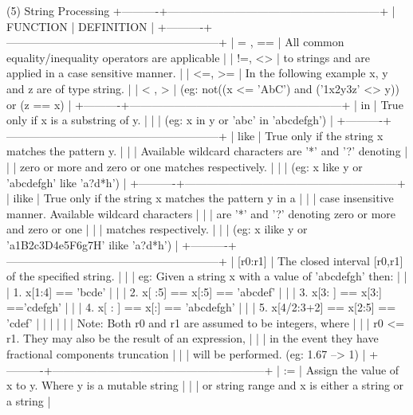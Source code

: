 (5) String Processing
+----------+---------------------------------------------------------+
| FUNCTION | DEFINITION                                              |
+----------+---------------------------------------------------------+
|  = , ==  | All common equality/inequality operators are applicable |
|  !=, <>  | to strings and are applied in a case sensitive manner.  |
|  <=, >=  | In the following example x, y and z are of type string. |
|  < , >   | (eg: not((x <= 'AbC') and ('1x2y3z' <> y)) or (z == x)  |
+----------+---------------------------------------------------------+
| in       | True only if x is a substring of y.                     |
|          | (eg: x in y or 'abc' in 'abcdefgh')                     |
+----------+---------------------------------------------------------+
| like     | True only if the string x matches the pattern y.        |
|          | Available wildcard characters are '*' and '?' denoting  |
|          | zero or more and zero or one matches respectively.      |
|          | (eg: x like y or 'abcdefgh' like 'a?d*h')               |
+----------+---------------------------------------------------------+
| ilike    | True only if the string x matches the pattern y in a    |
|          | case insensitive manner. Available wildcard characters  |
|          | are '*' and '?' denoting zero or more and zero or one   |
|          | matches respectively.                                   |
|          | (eg: x ilike y or 'a1B2c3D4e5F6g7H' ilike 'a?d*h')      |
+----------+---------------------------------------------------------+
| [r0:r1]  | The closed interval [r0,r1] of the specified string.    |
|          | eg: Given a string x with a value of 'abcdefgh' then:   |
|          | 1. x[1:4] == 'bcde'                                     |
|          | 2. x[ :5] == x[:5] == 'abcdef'                          |
|          | 3. x[3: ] == x[3:] =='cdefgh'                           |
|          | 4. x[ : ] == x[:] == 'abcdefgh'                         |
|          | 5. x[4/2:3+2] == x[2:5] == 'cdef'                       |
|          |                                                         |
|          | Note: Both r0 and r1 are assumed to be integers, where  |
|          | r0 <= r1. They may also be the result of an expression, |
|          | in the event they have fractional components truncation |
|          | will be performed. (eg: 1.67 --> 1)                     |
+----------+---------------------------------------------------------+
|  :=      | Assign the value of x to y. Where y is a mutable string |
|          | or string range and x is either a string or a string    |
